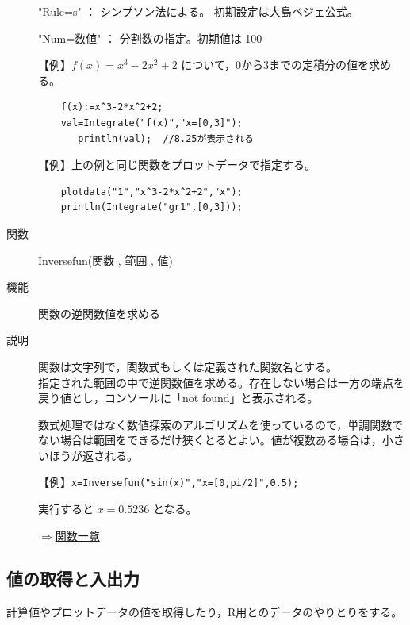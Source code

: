 \documentclass[papersize,a4paper,12pt,uplatex]{jsarticle}
\begin{document}
\begin{description}
  "Rule=s"    ：  シンプソン法による。 初期設定は大島ベジェ公式。
  
  "Num=数値"  ：  分割数の指定。初期値は 100 

\vspace{\baselineskip}
【例】$f(x)=x^3-2x^2+2$ について，0から3までの定積分の値を求める。
\begin{verbatim}
    f(x):=x^3-2*x^2+2;
    val=Integrate("f(x)","x=[0,3]");
       println(val);  //8.25が表示される
\end{verbatim}

\vspace{\baselineskip}
【例】上の例と同じ関数をプロットデータで指定する。
\begin{verbatim}
    plotdata("1","x^3-2*x^2+2","x");
    println(Integrate("gr1",[0,3]));
\end{verbatim}

\vspace{\baselineskip}
\hypertarget{inversefun}{}
\item[関数]  Inversefun(関数 , 範囲 , 値)
\item[機能]  関数の逆関数値を求める
\item[説明]  関数は文字列で，関数式もしくは定義された関数名とする。\\
  指定された範囲の中で逆関数値を求める。存在しない場合は一方の端点を戻り値とし，コンソールに「not found」と表示される。
  
数式処理ではなく数値探索のアルゴリズムを使っているので，単調関数でない場合は範囲をできるだけ狭くとるとよい。値が複数ある場合は，小さいほうが返される。


\vspace{\baselineskip}
【例】\verb|x=Inversefun("sin(x)","x=[0,pi/2]",0.5);|

実行すると $x=0.5236$ となる。
\begin{flushright}  \hyperlink{functionlist}{$\Rightarrow$関数一覧}\end{flushright}

\end{description}

\newpage
\subsection{値の取得と入出力}

  計算値やプロットデータの値を取得したり，R用とのデータのやりとりをする。
\end{document}
